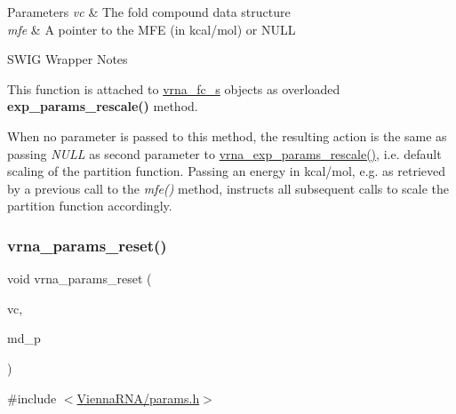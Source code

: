 \begin{DoxyParams}{Parameters}
{\em vc} & The fold compound data structure \\
\hline
{\em mfe} & A pointer to the M\+FE (in kcal/mol) or N\+U\+LL\\
\hline
\end{DoxyParams}
\begin{DoxyRefDesc}{S\+W\+I\+G Wrapper Notes}
\item[\mbox{\hyperlink{wrappers__wrappers000080}{S\+W\+I\+G Wrapper Notes}}]This function is attached to \mbox{\hyperlink{group__fold__compound_structvrna__fc__s}{vrna\+\_\+fc\+\_\+s}} objects as overloaded {\bfseries exp\+\_\+params\+\_\+rescale()} method.

When no parameter is passed to this method, the resulting action is the same as passing {\itshape N\+U\+LL} as second parameter to \mbox{\hyperlink{group__energy__parameters_gad607bc3a5b5da16400e2ca4ea5560233}{vrna\+\_\+exp\+\_\+params\+\_\+rescale()}}, i.\+e. default scaling of the partition function. Passing an energy in kcal/mol, e.\+g. as retrieved by a previous call to the {\itshape mfe()} method, instructs all subsequent calls to scale the partition function accordingly. \end{DoxyRefDesc}
\mbox{\label{group__energy__parameters_gac40dc82e48a72a97cfc58b9da08a7792}} 
\subsubsection{\texorpdfstring{vrna\+\_\+params\+\_\+reset()}{vrna\_params\_reset()}}
{\footnotesize\ttfamily void vrna\+\_\+params\+\_\+reset (\begin{DoxyParamCaption}\item[{\mbox{\hyperlink{group__fold__compound_ga1b0cef17fd40466cef5968eaeeff6166}{vrna\+\_\+fold\+\_\+compound\+\_\+t}} $\ast$}]{vc,  }\item[{\mbox{\hyperlink{group__model__details_ga1f8a10e12a0a1915f2a4eff0b28ea17c}{vrna\+\_\+md\+\_\+t}} $\ast$}]{md\+\_\+p }\end{DoxyParamCaption})}



{\ttfamily \#include $<$\mbox{\hyperlink{params_8h}{Vienna\+R\+N\+A/params.\+h}}$>$}



